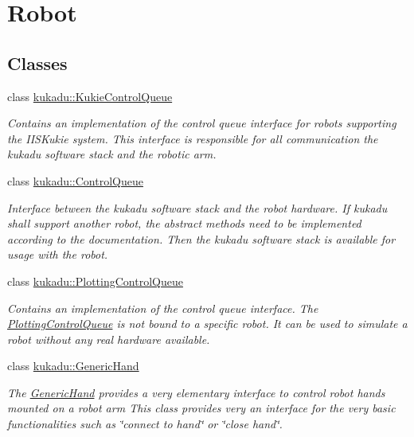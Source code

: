 \hypertarget{group__Robot}{\section{Robot}
\label{group__Robot}
}
\subsection*{Classes}
\begin{DoxyCompactItemize}
\item 
class \hyperlink{classkukadu_1_1KukieControlQueue}{kukadu\-::\-Kukie\-Control\-Queue}
\begin{DoxyCompactList}\small\item\em Contains an implementation of the control queue interface for robots supporting the I\-I\-S\-Kukie system. This interface is responsible for all communication the kukadu software stack and the robotic arm. \end{DoxyCompactList}\item 
class \hyperlink{classkukadu_1_1ControlQueue}{kukadu\-::\-Control\-Queue}
\begin{DoxyCompactList}\small\item\em Interface between the kukadu software stack and the robot hardware. If kukadu shall support another robot, the abstract methods need to be implemented according to the documentation. Then the kukadu software stack is available for usage with the robot. \end{DoxyCompactList}\item 
class \hyperlink{classkukadu_1_1PlottingControlQueue}{kukadu\-::\-Plotting\-Control\-Queue}
\begin{DoxyCompactList}\small\item\em Contains an implementation of the control queue interface. The \hyperlink{classkukadu_1_1PlottingControlQueue}{Plotting\-Control\-Queue} is not bound to a specific robot. It can be used to simulate a robot without any real hardware available. \end{DoxyCompactList}\item 
class \hyperlink{classkukadu_1_1GenericHand}{kukadu\-::\-Generic\-Hand}
\begin{DoxyCompactList}\small\item\em The \hyperlink{classkukadu_1_1GenericHand}{Generic\-Hand} provides a very elementary interface to control robot hands mounted on a robot arm This class provides very an interface for the very basic functionalities such as \char`\"{}connect to hand\char`\"{} or \char`\"{}close hand\char`\"{}. \end{DoxyCompactList}\item 

\end{DoxyCompactItemize}
